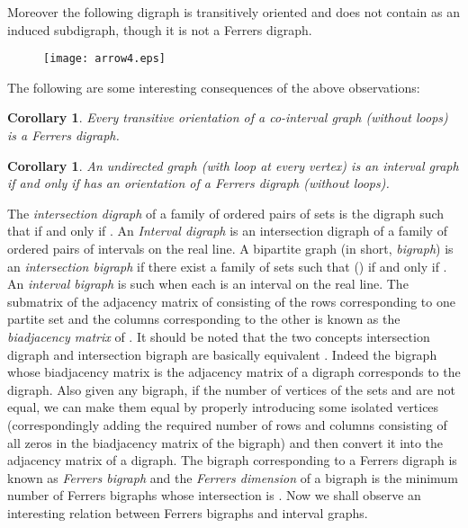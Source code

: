 \documentclass[11pt]{article}
\newtheorem{cor}[thm]{Corollary}
\theoremstyle{definition}
\theoremstyle{remark}
\numberwithin{equation}{section}
\begin{document}
\noindent Moreover the following digraph is transitively oriented and does not contain  as an induced subdigraph, though it is not a Ferrers digraph.

\begin{figure}[h]
\begin{center}
\texttt{[image: arrow4.eps]}
\end{center}
\end{figure}

The following are some interesting consequences of the above observations:

\begin{cor}\label{cor:chi}
Every transitive orientation of a co-interval graph (without loops) is a Ferrers digraph.
\end{cor}

\begin{cor}\label{cor:delta}
An undirected graph  (with loop at every vertex) is an interval graph if and only if  has an orientation of a Ferrers digraph (without loops). 
\end{cor}

The {\em intersection digraph}  of a family of ordered pairs of sets  is the digraph such that  if and only if . An {\em Interval digraph} is an intersection digraph of a family of ordered pairs of intervals on the real line. A bipartite graph (in short, {\em bigraph})  is an {\em intersection bigraph} if there exist a family  of sets such that  () if and only if . An {\em interval bigraph} is such when each  is an interval on the real line. The submatrix of the adjacency matrix of  consisting of the rows corresponding to one partite set and the columns corresponding to the other is known as the {\em biadjacency matrix} of . It should be noted that the two concepts intersection digraph and  intersection bigraph are basically equivalent \cite{P}. Indeed the bigraph whose biadjacency matrix is the adjacency matrix of a digraph corresponds to the digraph. Also given any bigraph, if the number of vertices of the sets  and  are not equal, we can make them equal by properly introducing some isolated vertices (correspondingly adding the required number of rows and columns consisting of all zeros in the biadjacency matrix of the bigraph) and then convert it into the adjacency matrix of a digraph. The bigraph corresponding to a Ferrers digraph is known as {\em Ferrers bigraph} and the {\em Ferrers dimension} of a bigraph  is the minimum number of Ferrers bigraphs whose intersection is . Now we shall observe an interesting relation between Ferrers bigraphs and interval graphs.
\end{document}
